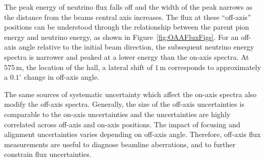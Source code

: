 The peak energy of neutrino flux falls off and the width of the peak narrows as the distance from the beams central axis increases. The flux at these ``off-axis'' positions can be understood through the relationship between the parent pion energy and neutrino energy, as shown in Figure~\ref{fig:OAAFluxFigs}. For an off-axis angle relative to the initial beam direction, the subsequent neutrino energy spectra is narrower and peaked at a lower energy than the on-axis spectra. At $575\,\textrm{m}$, the location of the  hall, a lateral shift of $1\,\textrm{m}$ corresponds to approximately a $0.1^\circ$ change in off-axis angle.


The same sources of systematic uncertainty which affect the on-axis spectra also modify the off-axis spectra.  Generally, the size of the off-axis uncertainties is comparable to the on-axis uncertainties and the uncertainties are highly correlated across off-axis and on-axis positions. 
The impact of focusing and alignment uncertainties varies depending on off-axis angle.
Therefore, off-axis flux measurements are useful to diagnose beamline aberrations, and to further constrain flux uncertainties.

